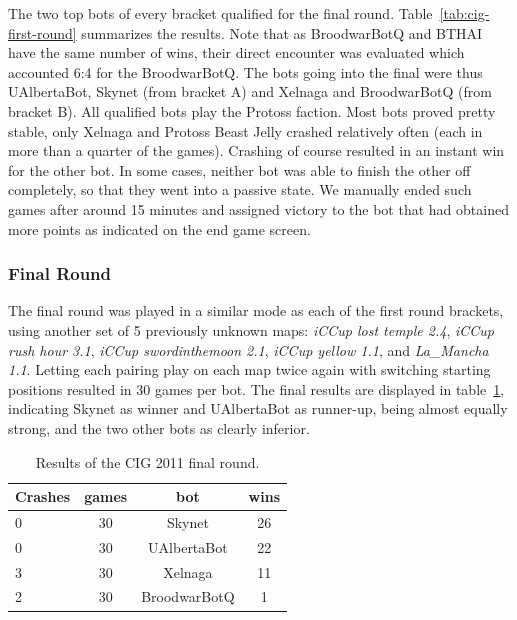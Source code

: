 \documentclass[journal]{IEEEtran}
\begin{document}
The two top bots of every bracket qualified
for the final round. Table~\ref{tab:cig-first-round} summarizes
the results.
Note that as BroodwarBotQ and BTHAI have the same number of wins,
their direct encounter was evaluated which accounted 6:4 for the BroodwarBotQ.
The bots going into the final were thus UAlbertaBot, Skynet (from bracket A)
and Xelnaga and BroodwarBotQ (from bracket B). All qualified bots play the
Protoss faction. Most bots proved pretty stable, only Xelnaga and Protoss 
Beast Jelly crashed relatively often (each in more than a quarter of the games). 
Crashing of course resulted in an instant win for the other bot.
In some cases, neither bot was able to finish the other off completely,
so that they went into a passive state. We manually ended such games after
around 15 minutes and assigned victory to the bot that had obtained more
points as indicated on the end game screen.


\subsubsection{Final Round}
\label{sec:cig-final-round}

The final round was played in a similar mode as each of the
first round brackets,
using another set of 5 previously unknown maps:
\emph{iCCup lost temple 2.4}, \emph{iCCup rush hour 3.1},
\emph{iCCup swordinthemoon 2.1}, \emph{iCCup yellow 1.1},
and \emph{La\_Mancha 1.1}. 
Letting each pairing play on each map twice again with
switching starting positions resulted in 30 games per bot.
The final results are displayed in table~\ref{tab:cig-final-round},
indicating Skynet as winner and UAlbertaBot as runner-up, being
almost equally strong, and the two other bots as clearly inferior.


\begin{table}[t!]
\caption{Results of the CIG 2011 final round.}
\label{tab:cig-final-round}
\begin{small}
\begin{center}
\begin{tabular}{|l|c|c|c|}
\hline
Crashes & games & bot	& wins\\ \hline
0 &  30 &	 Skynet	  		&  26\\
0 &	 30 &	 UAlbertaBot 	&  22\\
3 &	 30 &	 Xelnaga  		&  11\\
2 &	 30 &	 BroodwarBotQ  	&  1\\
\hline
\end{tabular}
\end{center}
\end{small}
\end{table}
\end{document}
